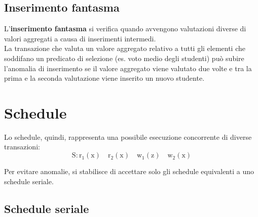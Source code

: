 \subsection{Inserimento fantasma}
L'\textbf{inserimento fantasma} si verifica quando avvengono valutazioni diverse di valori aggregati a causa di inserimenti intermedi.\\[0.2ex]
La transazione che valuta un valore aggregato relativo a tutti gli elementi che soddifano un predicato di selezione (es. voto medio degli studenti) può subire l'anomalia di inserimento se il valore aggregato viene valutato due volte e tra la prima e la seconda valutazione viene inserito un nuovo studente.

\section{Schedule}

Lo schedule, quindi, rappresenta una possibile esecuzione concorrente di diverse transazioni:
\begin{equation*}
    \mathrm{S: r_1(x) \quad r_2(x) \quad w_1(z) \quad w_2(x)}
\end{equation*}

Per evitare anomalie, si stabilisce di accettare solo gli schedule equivalenti a uno schedule seriale.

\subsection{Schedule seriale}

